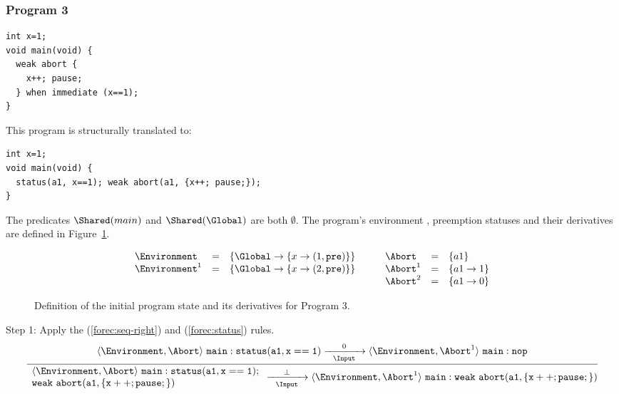 \subsubsection{Program 3}
\begin{lstlisting}[style=snippet]
int x=1;
void main(void) {
  weak abort {
    x++; pause;
  } when immediate (x==1);
}
\end{lstlisting}
This program is structurally translated to:
\begin{lstlisting}[style=snippet]
int x=1;
void main(void) {
  status(a1, x==1); weak abort(a1, {x++; pause;});
}
\end{lstlisting}
The predicates $\Shared(main)$ and $\Shared(\Global)$ are both $\emptyset$.
The program's environment \Environment{}, preemption statuses \Abort{}
and their derivatives are defined in Figure~\ref{figure:forec_program_3}.
\newline

\begin{figure}
	\centering
	$$\begin{array}{l l l l l l}
		\Environment		&=& \left \lbrace
									\Global \to \lbrace x \to (1, \mathtt{pre}) \rbrace
								\right \rbrace	& \qquad 
		\Abort				&=& \lbrace a1 \rbrace			\\
		\Environment^1		&=& \left \lbrace
									\Global \to \lbrace x \to (2, \mathtt{pre}) \rbrace
								\right \rbrace	& \qquad 
		\Abort^1			&=& \lbrace a1 \to 1 \rbrace	\\
		& & & \qquad 
		\Abort^2			&=& \lbrace a1 \to 0 \rbrace	\\
	\end{array}$$
	
	\caption{Definition of the initial program state and its derivatives for Program 3.}
	\label{figure:forec_program_3}
\end{figure}

\noindent
Step 1: Apply the (\ref{forec:seq-right}) and (\ref{forec:status}) rules. 
\begin{equation*}
	\frac{
			\langle \Environment, \Abort \rangle ~ \mathtt{main: status(a1, x==1)}
				\xrightarrow[~~\Input~~]{0} 
			\langle \Environment, \Abort^1 \rangle ~ \mathtt{main: nop}
		}{
			\begin{array}{l}
				\langle \Environment, \Abort \rangle ~ \mathtt{main: status(a1, x==1);}		\\
				\mathtt{weak~abort(a1, \{x++; pause;\})}
			\end{array}
				\xrightarrow[~~\Input~~]{\bot} 
			\langle \Environment, \Abort^1 \rangle ~ \mathtt{main: weak~abort(a1, \{x++; pause;\})}
		}
\end{equation*}

